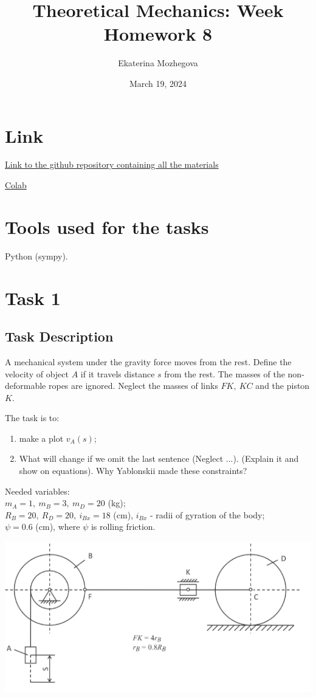 \documentclass{article}
\title{Theoretical Mechanics: Week Homework 8}
\author{Ekaterina Mozhegova}
\date{March 19, 2024}
\begin{document}
\maketitle

\section{Link}
\href{https://github.com/illusoryTwin/Theoretical_mechanics/tree/master/hw7}{Link to the github repository containing all the materials}

\href{https://colab.research.google.com/drive/16a0Ly4ZbjH2aNNC061sgZPgdEl7f_WWF?usp=sharing}{Colab}

\section{Tools used for the tasks}
Python (sympy).

\section{Task 1}

\subsection{Task Description}

A mechanical system under the gravity force moves from the rest. Define the velocity of object $A$ if it travels distance $s$ from the rest. The masses of the non-deformable ropes are ignored. Neglect the masses of links $FK,\ KC$ and the piston $K$.

The task is to:
\begin{enumerate}
    \item make a plot $v_A(s)$;
    \item What will change if we omit the last sentence (Neglect ...). (Explain it and show on equations). Why Yablonskii made these constraints?
\end{enumerate}

Needed variables:\\
$m_A=1,\ m_B=3,\ m_D=20$ (kg);\\
$R_B=20,\ R_D=20,\ i_{Bx}= 18$ (cm), $i_{Bx}$ - radii of gyration of the body;\\
$\psi = 0.6$ (cm), where $\psi$ is rolling friction.
   
\includegraphics[scale=0.5]{hw8_task1.png}
\end{document}
